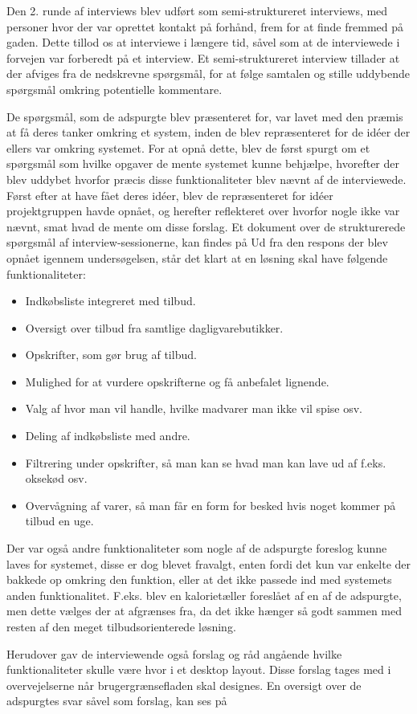 Den 2. runde af interviews blev udført som semi-struktureret interviews, med personer hvor der var oprettet kontakt på forhånd, frem for at finde fremmed på gaden.
Dette tillod os at interviewe i længere tid, såvel som at de interviewede i forvejen var forberedt på et interview.
Et semi-struktureret interview tillader at der afviges fra de nedskrevne spørgsmål, for at følge samtalen og stille uddybende spørgsmål omkring potentielle kommentare.

De spørgsmål, som de adspurgte blev præsenteret for, var lavet med den præmis at få deres tanker omkring et system, inden de blev repræsenteret for de idéer der ellers var omkring systemet.
For at opnå dette, blev de først spurgt om et spørgsmål som hvilke opgaver de mente systemet kunne behjælpe, hvorefter der blev uddybet hvorfor præcis disse funktionaliteter blev nævnt af de interviewede.
Først efter at have fået deres idéer, blev de repræsenteret for idéer projektgruppen havde opnået, og herefter reflekteret over hvorfor nogle ikke var nævnt, smat hvad de mente om disse forslag.
Et dokument over de strukturerede spørgsmål af interview-sessionerne, kan findes på %
Ud fra den respons der blev opnået igennem undersøgelsen, står det klart at en løsning skal have følgende funktionaliteter:

\begin{itemize}
	\item Indkøbsliste integreret med tilbud.
	\item Oversigt over tilbud fra samtlige dagligvarebutikker.
	\item Opskrifter, som gør brug af tilbud.
	\item Mulighed for at vurdere opskrifterne og få anbefalet lignende.
	\item Valg af hvor man vil handle, hvilke madvarer man ikke vil spise osv.
	\item Deling af indkøbsliste med andre.
	\item Filtrering under opskrifter, så man kan se hvad man kan lave ud af f.eks. oksekød osv.
	\item Overvågning af varer, så man får en form for besked hvis noget kommer på tilbud en uge.
\end{itemize}

Der var også andre funktionaliteter som nogle af de adspurgte foreslog kunne laves for systemet, disse er dog blevet fravalgt, enten fordi det kun var enkelte der bakkede op omkring den funktion, eller at det ikke passede ind med systemets anden funktionalitet.
F.eks. blev en kalorietæller foreslået af en af de adspurgte, men dette vælges der at afgrænses fra, da det ikke hænger så godt sammen med resten af den meget tilbudsorienterede løsning.

Herudover gav de interviewende også forslag og råd angående hvilke funktionaliteter skulle være hvor i et desktop layout.
Disse forslag tages med i overvejelserne når brugergrænsefladen skal designes.
En oversigt over de adspurgtes svar såvel som forslag, kan ses på %
